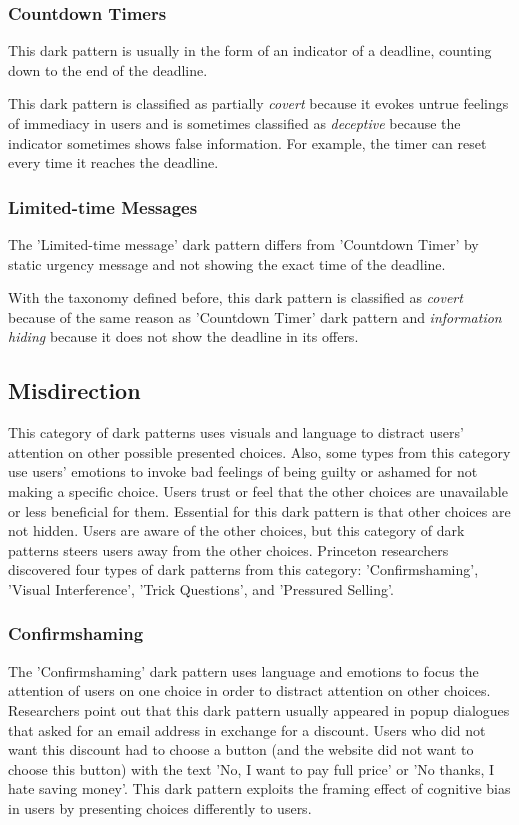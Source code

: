         \subsubsection{Countdown Timers}
        This dark pattern is usually in the form of an indicator of a deadline, counting down to the end of the deadline. 
        
        This dark pattern is classified as partially \emph{covert} because it evokes untrue feelings of immediacy in users and is sometimes classified as \emph{deceptive} because the indicator sometimes shows false information. For example, the timer can reset every time it reaches the deadline.

        \subsubsection{Limited-time Messages}
        The 'Limited-time message' dark pattern differs from 'Countdown Timer' by static urgency message and not showing the exact time of the deadline. 
        
        With the taxonomy defined before, this dark pattern is classified as \emph{covert} because of the same reason as 'Countdown Timer' dark pattern and \emph{information hiding} because it does not show the deadline in its offers.
    \subsection{Misdirection}
    This category of dark patterns uses visuals and language to distract users' attention on other possible presented choices. Also, some types from this category use users' emotions to invoke bad feelings of being guilty or ashamed for not making a specific choice. Users trust or feel that the other choices are unavailable or less beneficial for them. Essential for this dark pattern is that other choices are not hidden. Users are aware of the other choices, but this category of dark patterns steers users away from the other choices. Princeton researchers discovered four types of dark patterns from this category: 'Confirmshaming', 'Visual Interference', 'Trick Questions', and 'Pressured Selling'.
        \subsubsection{Confirmshaming}
        The 'Confirmshaming' dark pattern uses language and emotions to focus the attention of users on one choice in order to distract attention on other choices. Researchers point out that this dark pattern usually appeared in popup dialogues that asked for an email address in exchange for a discount. Users who did not want this discount had to choose a button (and the website did not want to choose this button) with the text 'No, I want to pay full price' or 'No thanks, I hate saving money'. This dark pattern exploits the framing effect of cognitive bias in users by presenting choices differently to users.
        

